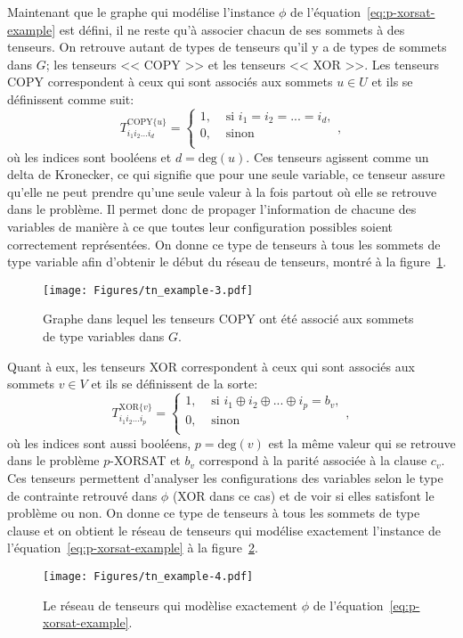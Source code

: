 Maintenant que le graphe qui modélise l'instance $\phi$ de l'équation~\ref{eq:p-xorsat-example} est défini, il ne reste qu'à associer chacun de ses sommets à des tenseurs.
On retrouve autant de types de tenseurs qu'il y a de types de sommets dans $G$; les tenseurs << COPY >> et les tenseurs << XOR >>.
Les tenseurs COPY correspondent à ceux qui sont associés aux sommets $u \in U$ et ils se définissent comme suit:
\begin{equation}\label{eq:COPY}
    T^{\text{COPY}\{u\}}_{i_1i_2...i_d} = \begin{cases}
        1, & \text{ si } i_1 = i_2 = ... = i_d,\\
        0, & \text{ sinon}\\
    \end{cases},
\end{equation}
où les indices sont booléens et $d = \mathrm{deg}(u)$.
Ces tenseurs agissent comme un delta de Kronecker, ce qui signifie que pour une seule variable, ce tenseur assure qu'elle ne peut prendre qu'une seule valeur à la fois partout où elle se retrouve dans le problème.
Il permet donc de propager l'information de chacune des variables de manière à ce que toutes leur configuration possibles soient correctement représentées.
On donne ce type de tenseurs à tous les sommets de type variable afin d'obtenir le début du réseau de tenseurs, montré à la figure~\ref{fig:tn-example3}.
\begin{figure}[h]
    \centering
    \texttt{[image: Figures/tn\_example-3.pdf]}
    \caption{Graphe dans lequel les tenseurs COPY ont été associé aux sommets de type variables dans $G$.}
    \label{fig:tn-example3}
\end{figure}
Quant à eux, les tenseurs XOR correspondent à ceux qui sont associés aux sommets $v \in V$ et ils se définissent de la sorte:
\begin{equation} \label{eq:XOR-tensor}
    T^{\text{XOR}\{v\}}_{i_1i_2...i_p} = \begin{cases}
        1, & \text{ si } i_1 \oplus i_2 \oplus ... \oplus i_p = b_v,\\
        0, & \text{ sinon}\\
    \end{cases},
\end{equation}
où les indices sont aussi booléens, $p = \mathrm{deg}(v)$ est la même valeur qui se retrouve dans le problème $p$-XORSAT et $b_v$ correspond à la parité associée à la clause $c_v$.
Ces tenseurs permettent d'analyser les configurations des variables selon le type de contrainte retrouvé dans $\phi$ (XOR dans ce cas) et de voir si elles satisfont le problème ou non.
On donne ce type de tenseurs à tous les sommets de type clause et on obtient le réseau de tenseurs qui modélise exactement l'instance de l'équation~\ref{eq:p-xorsat-example} à la figure~\ref{fig:tn-example4}.
\begin{figure}[h]
    \centering
    \texttt{[image: Figures/tn\_example-4.pdf]}
    \caption{Le réseau de tenseurs qui modèlise exactement $\phi$ de l'équation~\ref{eq:p-xorsat-example}.}
    \label{fig:tn-example4}
\end{figure}

